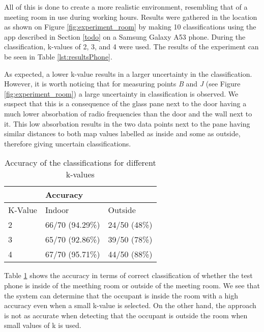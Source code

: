 All of this is done to create a more realistic environment, resembling that of a meeting room in use during working hours. 
Results were gathered in the location as shown on Figure \ref{fig:experiment_room} by making 10 classifications using the app described in Section \ref{todo}  on a Samsung Galaxy A53 phone.
During the classification, k-values of 2, 3, and 4 were used. 
The results of the experiment can be seen in Table \ref{lst:resultsPhone}.

As expected, a lower k-value results in a larger uncertainty in the classification.
However, it is worth noticing that for measuring points \textit{B} and \textit{J}  (see Figure \ref{fig:experiment_room}) a large uncertainty in classification is observed.  
We suspect that this is a consequence of the glass pane next to the door having a much lower absorbation of radio frequencies than the door and the wall next to it. 
This low absorbation results in the two data points next to the pane having similar distances to both map values labelled as inside and some as outside, therefore giving uncertain classifications.

\begin{table}[H]
    \centering
    \begin{tabular}{|l|ll|}
    \hline
            & \multicolumn{2}{l|}{Accuracy}                      \\ \hline
    K-Value & \multicolumn{1}{l|}{Indoor}          & Outside      \\ \hline
    2       & \multicolumn{1}{l|}{66/70 (94.29\%)} & 24/50 (48\%) \\ \hline
    3       & \multicolumn{1}{l|}{65/70 (92.86\%)} & 39/50 (78\%) \\ \hline
    4       & \multicolumn{1}{l|}{67/70 (95.71\%)} & 44/50 (88\%) \\ \hline   
    \end{tabular}
    \caption{Accuracy of the classifications for different k-values}
    \label{lst:resultsPhone_precision}
\end{table}

Table \ref{lst:resultsPhone_precision} shows the accuracy in terms of correct classification of whether the test phone is inside of the meething room or outside of the meeting room.
We see that the system can determine that the occupant is inside the room with a high accuracy even when a small k-value is selected.
On the other hand, the approach is not as accurate when detecting that the occupant is outside the room when small values of k is used.  
